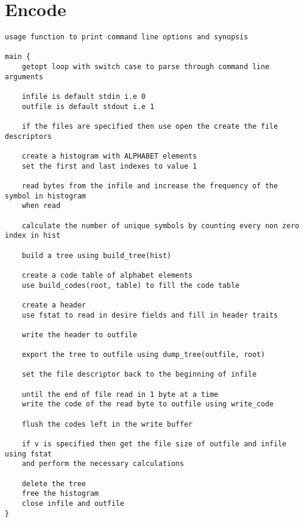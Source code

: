 \documentclass[11pt]{article}
\begin{document}
\section{Encode}
\begin{verbatim}
usage function to print command line options and synopsis

main {
    getopt loop with switch case to parse through command line arguments
    
    infile is default stdin i.e 0
    outfile is default stdout i.e 1
    
    if the files are specified then use open the create the file descriptors
    
    create a histogram with ALPHABET elements
    set the first and last indexes to value 1
    
    read bytes from the infile and increase the frequency of the symbol in histogram
    when read
    
    calculate the number of unique symbols by counting every non zero index in hist
    
    build a tree using build_tree(hist)
    
    create a code table of alphabet elements
    use build_codes(root, table) to fill the code table
    
    create a header
    use fstat to read in desire fields and fill in header traits
    
    write the header to outfile
    
    export the tree to outfile using dump_tree(outfile, root)
    
    set the file descriptor back to the beginning of infile
    
    until the end of file read in 1 byte at a time
    write the code of the read byte to outfile using write_code
    
    flush the codes left in the write buffer
    
    if v is specified then get the file size of outfile and infile using fstat
    and perform the necessary calculations
    
    delete the tree
    free the histogram
    close infile and outfile
}    
\end{verbatim}
\end{document}
